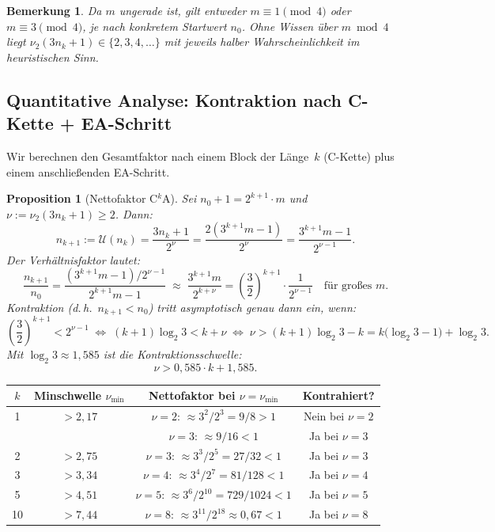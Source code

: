 \documentclass[12pt,a4paper]{article}
\newtheorem{proposition}[definition]{Proposition}
\newtheorem{bemerkung}[definition]{Bemerkung}
\newcommand{\vii}{\nu_2}
\newcommand{\U}{\mathcal{U}}
\begin{document}
	\begin{bemerkung}
		Da $m$ ungerade ist, gilt entweder $m \equiv 1 \pmod 4$ oder $m \equiv 3 \pmod 4$,
		je nach konkretem Startwert $n_0$. Ohne Wissen über $m \bmod 4$ liegt
		$\vii(3n_k+1) \in \{2, 3, 4, \ldots\}$ mit jeweils halber Wahrscheinlichkeit
		im heuristischen Sinn.
	\end{bemerkung}
	
	\subsection{Quantitative Analyse: Kontraktion nach C-Kette + EA-Schritt}
	
	Wir berechnen den Gesamtfaktor nach einem Block der Länge~$k$ (C-Kette) plus
	einem anschließenden EA-Schritt.
	
	\begin{proposition}[Nettofaktor C$^k$A]
		\label{prop:ck-a-faktor}
		Sei $n_0+1 = 2^{k+1} \cdot m$ und $\nu := \vii(3n_k+1) \geq 2$. Dann:
		\[
		n_{k+1} := \U(n_k) = \frac{3n_k+1}{2^\nu} = \frac{2(3^{k+1}m-1)}{2^\nu}
		= \frac{3^{k+1}m - 1}{2^{\nu-1}}.
		\]
		Der Verhältnisfaktor lautet:
		\[
		\frac{n_{k+1}}{n_0}
		= \frac{(3^{k+1}m - 1)/2^{\nu-1}}{2^{k+1}m - 1}
		\;\approx\; \frac{3^{k+1}m}{2^{k+\nu}}
		= \left(\frac{3}{2}\right)^{k+1} \cdot \frac{1}{2^{\nu-1}}
		\quad\text{für großes }m.
		\]
		Kontraktion (d.\,h.\ $n_{k+1} < n_0$) tritt asymptotisch genau dann ein, wenn:
		\[
		\left(\frac{3}{2}\right)^{k+1} < 2^{\nu-1}
		\;\Longleftrightarrow\;
		(k+1)\log_2 3 < k + \nu
		\;\Longleftrightarrow\;
		\nu > (k+1)\log_2 3 - k = k\bigl(\log_2 3 - 1\bigr) + \log_2 3.
		\]
		Mit $\log_2 3 \approx 1{,}585$ ist die Kontraktionsschwelle:
		\[
		\nu > 0{,}585 \cdot k + 1{,}585.
		\]
	\end{proposition}
	
	\begin{center}
		\renewcommand{\arraystretch}{1.4}
		\begin{tabular}{cccc}
			\toprule
			$k$ & Minschwelle $\nu_{\min}$ & Nettofaktor bei $\nu = \nu_{\min}$ & Kontrahiert? \\
			\midrule
			1 & $> 2{,}17$ & $\nu=2$: $\approx 3^2/2^3 = 9/8 > 1$ & Nein bei $\nu=2$ \\
			&            & $\nu=3$: $\approx 9/16 < 1$ & Ja bei $\nu=3$ \\
			2 & $> 2{,}75$ & $\nu=3$: $\approx 3^3/2^5 = 27/32 < 1$ & Ja bei $\nu=3$ \\
			3 & $> 3{,}34$ & $\nu=4$: $\approx 3^4/2^7 = 81/128 < 1$ & Ja bei $\nu=4$ \\
			5 & $> 4{,}51$ & $\nu=5$: $\approx 3^6/2^{10} = 729/1024 < 1$ & Ja bei $\nu=5$ \\
			10 & $> 7{,}44$ & $\nu=8$: $\approx 3^{11}/2^{18} \approx 0{,}67 < 1$ & Ja bei $\nu=8$ \\
			\bottomrule
		\end{tabular}
	\end{center}
	
\end{document}
